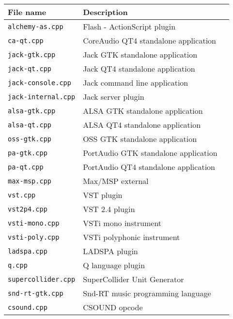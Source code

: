 \begin{table}[htp]
\begin{center}
\begin{tabular}{|l|l|l|}
\hline
\textbf{File name}			& \textbf{Description}   \\
\hline
\texttt{alchemy-as.cpp} 	& Flash - ActionScript plugin \\
\texttt{ca-qt.cpp} 			& CoreAudio QT4 standalone application  \\
\texttt{jack-gtk.cpp} 		& Jack GTK standalone application  \\
\texttt{jack-qt.cpp} 		& Jack QT4 standalone application  \\
\texttt{jack-console.cpp} 	& Jack command line application  \\
\texttt{jack-internal.cpp} 	& Jack server plugin  \\
\texttt{alsa-gtk.cpp} 		& ALSA GTK standalone application  \\
\texttt{alsa-qt.cpp} 		& ALSA QT4 standalone application  \\
\texttt{oss-gtk.cpp} 		& OSS GTK standalone application  \\
\texttt{pa-gtk.cpp} 		& PortAudio GTK standalone application  \\
\texttt{pa-qt.cpp} 			& PortAudio QT4 standalone application  \\
\hline
\texttt{max-msp.cpp} 		& Max/MSP external  \\
\texttt{vst.cpp} 			& VST plugin  \\
\texttt{vst2p4.cpp} 		& VST 2.4 plugin  \\
\texttt{vsti-mono.cpp} 		& VSTi mono instrument  \\
\texttt{vsti-poly.cpp} 		& VSTi polyphonic instrument  \\
\texttt{ladspa.cpp} 		& LADSPA plugin  \\
\texttt{q.cpp} 				& Q language plugin  \\
\texttt{supercollider.cpp} 	& SuperCollider Unit Generator  \\
\texttt{snd-rt-gtk.cpp} 	& Snd-RT music programming language  \\
\texttt{csound.cpp} 		& CSOUND opcode  \\

\end{tabular}
\end{center}
\end{table}
